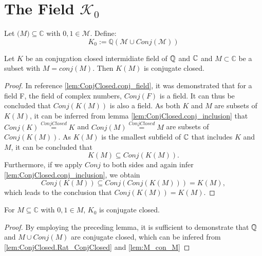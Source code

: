 \section[K zero]{The Field $\mathcal{K}_0$}
\begin{definition}
    \label{def:K_M_0}
    Let $\mathcal(M)\subseteq\mathbb{C}$ with $0,1 \in \mathcal{M}$. Define:
    \begin{equation*}
        K_0 := \mathbb{Q}(\mathcal{M}\cup Conj(\mathcal{M}))
    \end{equation*}
\end{definition}

\begin{lemma}
    \label{lem:conj_adjion}
    \leanok
    Let $K$ be an conjugation closed intermidiate field of $\mathbb{Q}$ and $\mathbb{C}$ and $ M \subset \mathbb{C}$ be a subset with $M = conj(M)$. Then
    $K(M)$ is conjugate closed.
\end{lemma}
\begin{proof}
    In reference \ref{lem:ConjClosed.conj_field}, it was demonstrated that for a field F, the field of complex numbers, $Conj(F)$ is a field. 
    It can thus be concluded that $Conj(K(M))$ is also a field.
    As both $K$ and $M$ are subsets of $K(M)$, it can be inferred from lemma \ref{lem:ConjClosed.conj_inclusion} that $Conj(K) \overset{ConjClosed}{=} K$ and $Conj(M) \overset{ConjClosed}{=} M$ are subsets of $Conj(K(M))$. 
    As $K(M)$ is the smallest subfield of $\mathbb{C}$ that includes $K$ and $M$, it can be concluded that $$K(M) \subseteq Conj(K(M)).$$
    Furthermore, if we apply $Conj$ to both sides and again infer \ref{lem:ConjClosed.conj_inclusion}, we obtain $$Conj(K(M)) \subseteq Conj(Conj(K(M))) = K(M),$$ 
    which leads to the conclusion that $Conj(K(M)) = K(M)$.
\end{proof}

\begin{corollary}
    \label{cor:K_zero_conjectClosed}
    \leanok
    For $M\subseteq \mathbb{C}$ with $0,1 \in M$, $K_0$ is conjugate closed.
\end{corollary}
\begin{proof}
    By employing the preceding lemma, it is sufficient to demonstrate that $\mathbb{Q}$ and $M \cup Conj(M)$ are conjugate closed,
    which can be infered from \ref{lem:ConjClosed.Rat_ConjClosed} and \ref{lem:M_con_M}
\end{proof}

